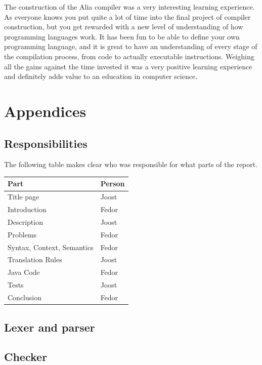 \documentclass[paper=a4, fontsize=11pt]{article}
\numberwithin{equation}{section}		%
\numberwithin{figure}{section}			%
\numberwithin{table}{section}				%
\begin{document}
The construction of the Alia compiler was a very interesting learning experience. As everyone knows you put quite a lot of time into the final project of compiler construction, but you get rewarded with a new level of understanding of how programming languages work. It has been fun to be able to define your own programming language, and it is great to have an understanding of every stage of the compilation process, from code to actually executable instructions. Weighing all the gains against the time invested it was a very positive learning experience and definitely adds value to an education in computer science.

\newpage
\appendix
\section{Appendices}

\subsection{Responsibilities}
The following table makes clear who was responsible for what parts of the report.\\
\begin{tabular}{l | l}
Part & Person \\ \hline
Title page & Joost \\
Introduction & Fedor\\
Description & Joost \\
Problems & Fedor \\
Syntax, Context, Semantics & Fedor \\
Translation Rules & Joost\\
Java Code & Fedor\\
Tests & Joost \\
Conclusion & Fedor \\
\end{tabular}

\subsection{Lexer and parser}



\subsection{Checker}
\end{document}
